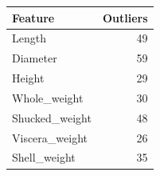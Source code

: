 \begin{tabular}{lr}
\toprule
Feature & Outliers \\
\midrule
Length & 49 \\
Diameter & 59 \\
Height & 29 \\
Whole\_weight & 30 \\
Shucked\_weight & 48 \\
Viscera\_weight & 26 \\
Shell\_weight & 35 \\
\bottomrule
\end{tabular}
